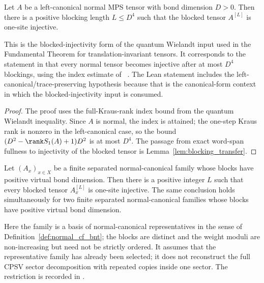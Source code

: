 \begin{theorem}%
    \label{thm:bounded_injective_blocking_normal_left_canonical}
    \leanok
    Let $A$ be a left-canonical normal MPS tensor with bond dimension $D > 0$.
    Then there is a positive blocking length $L \le D^4$ such that the blocked
    tensor $A^{[L]}$ is one-site injective.

    This is the blocked-injectivity form of the quantum Wielandt input used in
    the Fundamental Theorem for translation-invariant tensors. It corresponds to the statement
    in \cite[Section~II, line~332]{Cirac2016MPDO_arXiv} that every normal tensor
    becomes injective after at most $D^4$ blockings, using the index estimate of~%
    \cite[Theorem~1]{Sanz2010Quantum}. The Lean statement includes the
    left-canonical/trace-preserving hypothesis because that is the canonical-form
    context in which the blocked-injectivity input is consumed.
\end{theorem}

\begin{proof}
    \leanok
    The proof uses the full-Kraus-rank index bound from the quantum Wielandt
    inequality. Since $A$ is normal, the index is attained; the one-step Kraus
    rank is nonzero in the left-canonical case, so the bound
    $(D^2 - \rank S_1(A) + 1)D^2$ is at most $D^4$. The passage from
    exact word-span fullness to injectivity of the blocked tensor is
    Lemma~\ref{lem:blocking_transfer}.
\end{proof}

\begin{corollary}%
    \label{cor:uniform_injective_blocking_normal_bnt}
    \leanok
    Let $(A_x)_{x \in X}$ be a finite separated normal-canonical family whose
    blocks have positive virtual bond dimension. Then there is a positive
    integer $L$ such that every blocked tensor $A_x^{[L]}$ is one-site
    injective. The same conclusion holds simultaneously for two finite
    separated normal-canonical families whose blocks have positive virtual bond
    dimension.

    Here the family is a basis of normal-canonical representatives in the sense
    of Definition~\ref{def:normal_cf_bnt}; the blocks are distinct and the weight
    moduli are non-increasing but need not be strictly ordered. It assumes that
    the representative family has already been selected; it does not reconstruct
    the full CPSV sector decomposition with repeated copies inside one sector.
    The restriction is recorded in
    .
\end{corollary}

